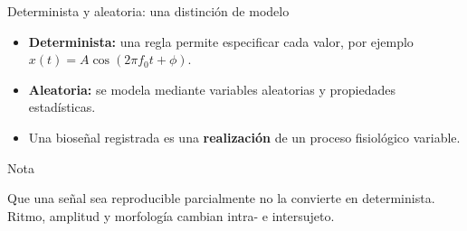 \documentclass[
  10pt,
  ignorenonframetext,
  aspectratio=169,
  spanish,
]{beamer}
\providecommand{\tightlist}{%
  \setlength{\itemsep}{0pt}\setlength{\parskip}{0pt}}
\begin{document}
\begin{frame}{Determinista y aleatoria: una distinción de modelo}
\label{d1-028}
\begin{itemize}
\tightlist
\item
  \textbf{Determinista:} una regla permite especificar cada valor, por
  ejemplo \(x(t)=A\cos(2\pi f_0t+\phi)\).
\item
  \textbf{Aleatoria:} se modela mediante variables aleatorias y
  propiedades estadísticas.
\item
  Una bioseñal registrada es una \textbf{realización} de un proceso
  fisiológico variable.
\end{itemize}

\begin{block}{Nota}

Que una señal sea reproducible parcialmente no la convierte en
determinista. Ritmo, amplitud y morfología cambian intra- e intersujeto.

\end{block}

\end{frame}
\end{document}
